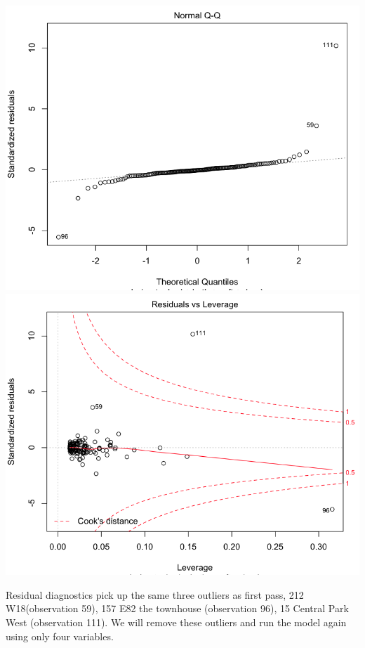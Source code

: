 \documentclass[a4 paper, 11 pt, twocolumn]{article}
\begin{document}
\begin{center}
\includegraphics[scale=0.3]{QQ3}
\includegraphics[scale=0.3]{CooksD3}
\end{center}
Residual diagnostics pick up the same three outliers as first pass, 212 W18(observation 59), 157 E82 the townhouse (observation 96), 15 Central Park West (observation 111). We will remove these outliers and run the model again using only four variables.
\end{document}

